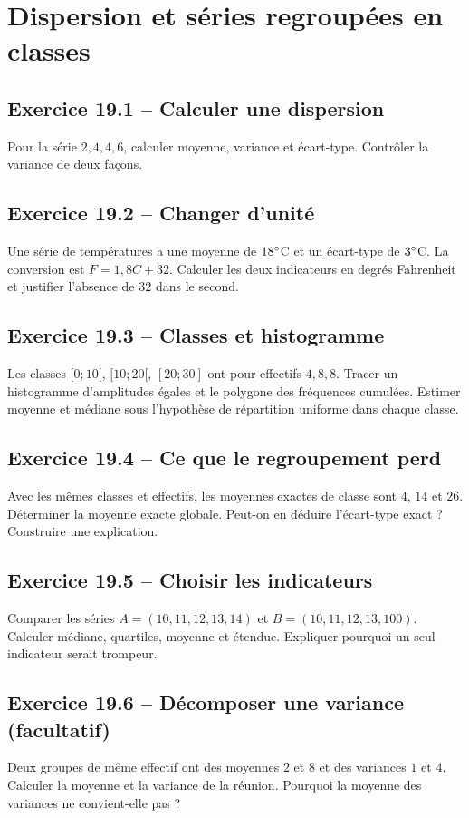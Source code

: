 \chapter{Dispersion et séries regroupées en classes}
\section*{Exercice 19.1 -- Calculer une dispersion}
Pour la série $2,4,4,6$, calculer moyenne, variance et écart-type. Contrôler la variance de deux façons.

\section*{Exercice 19.2 -- Changer d'unité}
Une série de températures a une moyenne de $18^{\circ}$C et un écart-type de $3^{\circ}$C. La conversion est $F=1{,}8C+32$. Calculer les deux indicateurs en degrés Fahrenheit et justifier l'absence de $32$ dans le second.

\section*{Exercice 19.3 -- Classes et histogramme}
Les classes $[0;10[$, $[10;20[$, $[20;30]$ ont pour effectifs $4,8,8$. Tracer un histogramme d'amplitudes égales et le polygone des fréquences cumulées. Estimer moyenne et médiane sous l'hypothèse de répartition uniforme dans chaque classe.

\section*{Exercice 19.4 -- Ce que le regroupement perd}
Avec les mêmes classes et effectifs, les moyennes exactes de classe sont $4$, $14$ et $26$. Déterminer la moyenne exacte globale. Peut-on en déduire l'écart-type exact ? Construire une explication.

\section*{Exercice 19.5 -- Choisir les indicateurs}
Comparer les séries $A=(10,11,12,13,14)$ et $B=(10,11,12,13,100)$. Calculer médiane, quartiles, moyenne et étendue. Expliquer pourquoi un seul indicateur serait trompeur.

\section*{Exercice 19.6 -- Décomposer une variance (facultatif)}
Deux groupes de même effectif ont des moyennes $2$ et $8$ et des variances $1$ et $4$. Calculer la moyenne et la variance de la réunion. Pourquoi la moyenne des variances ne convient-elle pas ?
